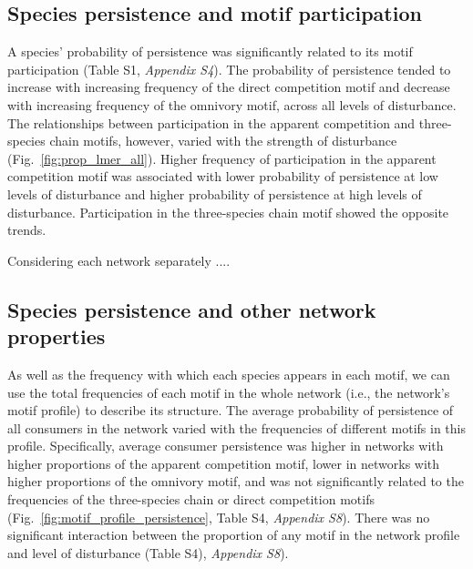 \documentclass[12pt]{article}
\begin{document}
\begin{spacing}{2.0}
    \subsection*{Species persistence and motif participation} 

        A species' probability of persistence was significantly related to its motif participation (Table S1, \emph{Appendix S4}).
        The probability of persistence tended to increase with increasing frequency of the direct competition motif and decrease with increasing frequency of the omnivory motif, across all levels of disturbance.
        The relationships between participation in the apparent competition and three-species chain motifs, however, varied with the strength of disturbance (Fig.~\ref{fig:prop_lmer_all}).
        Higher frequency of participation in the apparent competition motif was associated with lower probability of persistence at low levels of disturbance and higher probability of persistence at high levels of disturbance.
        Participation in the three-species chain motif showed the opposite trends.
    

        Considering each network separately ....

    \subsection*{Species persistence and other network properties}

        As well as the frequency with which each species appears in each motif, we can use the total frequencies of each motif in the whole network (i.e., the network's motif profile) to describe its structure.
        The average probability of persistence of all consumers in the network varied with the frequencies of different motifs in this profile.
        Specifically, average consumer persistence was higher in networks with higher proportions of the apparent competition motif, lower in networks with higher proportions of the omnivory motif, and was not significantly related to the frequencies of the three-species chain or direct competition motifs (Fig.~\ref{fig:motif_profile_persistence}, Table S4, \emph{Appendix S8}). 
        There was no significant interaction between the proportion of any motif in the network profile and level of disturbance (Table S4), \emph{Appendix S8}).



\end{spacing}
\end{document}
